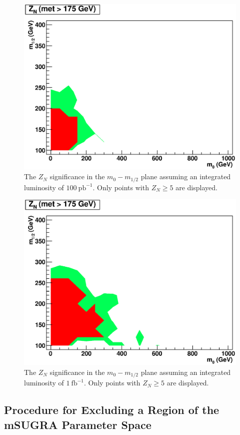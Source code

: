 \begin{figure}[htb]
\begin{center}
\includegraphics[width=0.7\linewidth]{figs/hzn175_100pb.eps}
\caption{The  $Z_{N}$   significance  in  the   $m_{0}-m_{1/2}$  plane
assuming  an  integrated  luminosity of  $100~\mathrm{pb}^{-1}$.  Only
points with $Z_{N}\geq5$ are displayed. \label{fig:zn100pb}}
\end{center}

\end{figure}
\begin{figure}[htb]
\begin{center}
\includegraphics[width=0.7\linewidth]{figs/hzn175_1fb.eps}
\caption{The  $Z_{N}$   significance  in  the   $m_{0}-m_{1/2}$  plane
assuming an integrated luminosity of $1~\mathrm{fb}^{-1}$. Only points
with $Z_{N}\geq5$ are displayed. \label{fig:zn1fb}}
\end{center}
\end{figure}

\subsection{Procedure for Excluding a Region of the mSUGRA Parameter Space}
\label{sec:exclusion}

